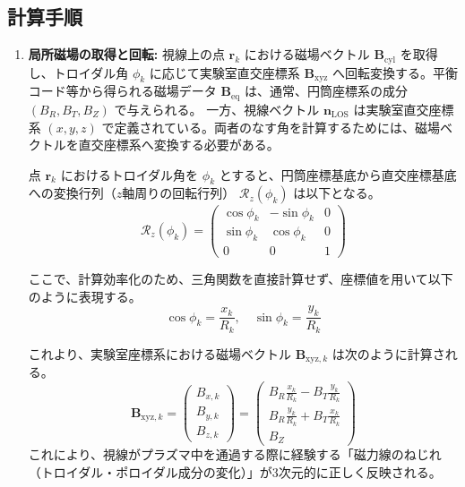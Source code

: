\documentclass[a4paper,11pt]{bxjsarticle} %
\begin{document}
\subsection{計算手順}
\begin{enumerate}
    \item \textbf{局所磁場の取得と回転:}
    視線上の点 $\bm{r}_k$ における磁場ベクトル $\bm{B}_{\mathrm{cyl}}$ を取得し、トロイダル角 $\phi_k$ に応じて実験室直交座標系 $\bm{B}_{\mathrm{xyz}}$ へ回転変換する。平衡コード等から得られる磁場データ $\bm{B}_{\mathrm{eq}}$ は、通常、円筒座標系の成分 $(B_R, B_T, B_Z)$ で与えられる。
    一方、視線ベクトル $\bm{n}_{\mathrm{LOS}}$ は実験室直交座標系 $(x, y, z)$ で定義されている。両者のなす角を計算するためには、磁場ベクトルを直交座標系へ変換する必要がある。

    点 $\bm{r}_k$ におけるトロイダル角を $\phi_k$ とすると、円筒座標基底から直交座標基底への変換行列（$z$軸周りの回転行列） $\mathcal{R}_z(\phi_k)$ は以下となる。
    \begin{equation}
        \mathcal{R}_z(\phi_k) = 
        \begin{pmatrix}
            \cos\phi_k & -\sin\phi_k & 0 \\
            \sin\phi_k & \cos\phi_k & 0 \\
            0 & 0 & 1
        \end{pmatrix}
    \end{equation}

    ここで、計算効率化のため、三角関数を直接計算せず、座標値を用いて以下のように表現する。
    \begin{equation}
        \cos\phi_k = \frac{x_k}{R_k}, \quad \sin\phi_k = \frac{y_k}{R_k}
    \end{equation}

    これより、実験室座標系における磁場ベクトル $\bm{B}_{\mathrm{xyz}, k}$ は次のように計算される。
    \begin{equation}
        \bm{B}_{\mathrm{xyz}, k} = 
        \begin{pmatrix}
            B_{x,k} \\
            B_{y,k} \\
            B_{z,k}
        \end{pmatrix}
        =
        \begin{pmatrix}
            B_R \frac{x_k}{R_k} - B_T \frac{y_k}{R_k} \\
            B_R \frac{y_k}{R_k} + B_T \frac{x_k}{R_k} \\
            B_Z
        \end{pmatrix}
    \end{equation}
    これにより、視線がプラズマ中を通過する際に経験する「磁力線のねじれ（トロイダル・ポロイダル成分の変化）」が3次元的に正しく反映される。
    

\end{enumerate}
\end{document}
